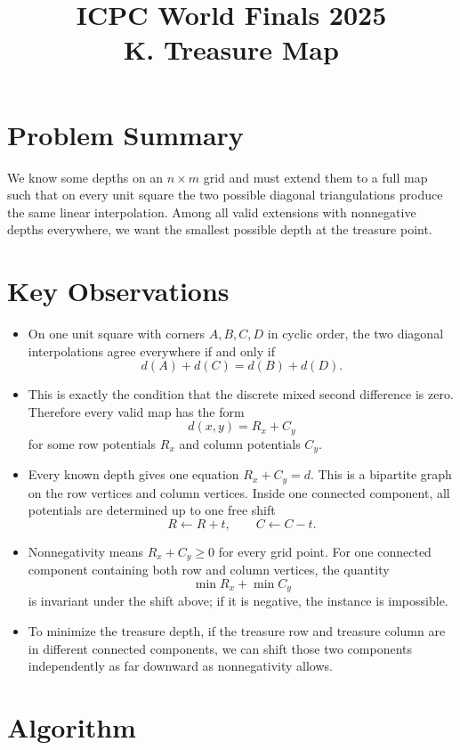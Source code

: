 \documentclass[11pt]{article}
\title{ICPC World Finals 2025\\K. Treasure Map}
\author{}
\date{}
\begin{document}
\maketitle

\section*{Problem Summary}

We know some depths on an $n \times m$ grid and must extend them to a full map such that on every unit
square the two possible diagonal triangulations produce the same linear interpolation. Among all valid
extensions with nonnegative depths everywhere, we want the smallest possible depth at the treasure
point.

\section*{Key Observations}

\begin{itemize}[leftmargin=*]
    \item On one unit square with corners $A,B,C,D$ in cyclic order, the two diagonal interpolations agree
    everywhere if and only if
    \[
    d(A)+d(C)=d(B)+d(D).
    \]
    \item This is exactly the condition that the discrete mixed second difference is zero. Therefore every
    valid map has the form
    \[
    d(x,y)=R_x + C_y
    \]
    for some row potentials $R_x$ and column potentials $C_y$.
    \item Every known depth gives one equation $R_x + C_y = d$.
    This is a bipartite graph on the row vertices and column vertices.
    Inside one connected component, all potentials are determined up to one free shift
    \[
    R \leftarrow R+t,\qquad C \leftarrow C-t.
    \]
    \item Nonnegativity means $R_x + C_y \ge 0$ for every grid point.
    For one connected component containing both row and column vertices, the quantity
    \[
    \min R_x + \min C_y
    \]
    is invariant under the shift above; if it is negative, the instance is impossible.
    \item To minimize the treasure depth, if the treasure row and treasure column are in different connected
    components, we can shift those two components independently as far downward as nonnegativity
    allows.
\end{itemize}

\section*{Algorithm}
\end{document}
